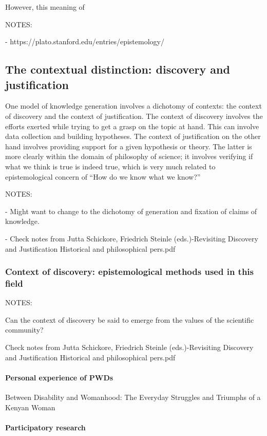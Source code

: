 \documentclass{lps}
\begin{document}
However, this meaning of 



NOTES:


- https://plato.stanford.edu/entries/epistemology/



\subsection{The contextual distinction: discovery and justification}

One model of knowledge generation involves a dichotomy of contexts: the
context of discovery and the context of justification. The context of
discovery involves the efforts exerted while trying to get a grasp on the
topic at hand. This can involve data collection and building hypotheses. The
context of justification on the other hand involves providing support for a
given hypothesis or theory. The latter is more clearly within the domain of
philosophy of science; it involves verifying if what we think is true is
indeed true, which is very much related to epistemological concern of “How do
we know what we know?” 


NOTES:

- Might want to change to the dichotomy of generation and fixation of claims of
knowledge.

- Check notes from Jutta Schickore, Friedrich Steinle (eds.)-Revisiting
Discovery and Justification Historical and philosophical pers.pdf

\subsubsection{Context of discovery: epistemological methods used in this field}

NOTES:

Can the context of discovery be said to emerge from the values of the
scientific community?

Check notes from Jutta Schickore, Friedrich Steinle (eds.)-Revisiting
Discovery and Justification Historical and philosophical pers.pdf


\paragraph{Personal experience of PWDs}

Between Disability and Womanhood: The Everyday Struggles and Triumphs of a
Kenyan Woman

\paragraph{Participatory research}
\end{document}
